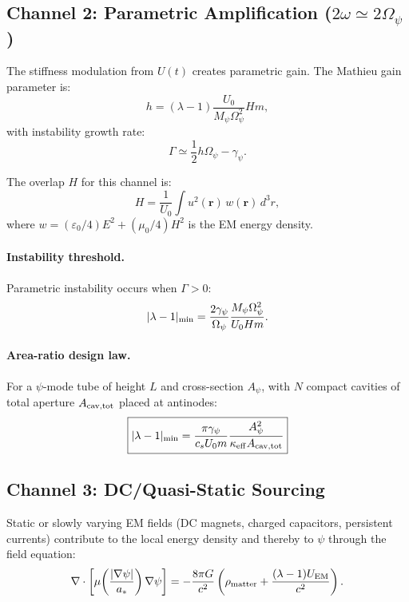 \documentclass[aps,prd,twocolumn,superscriptaddress,floatfix,nofootinbib]{revtex4-2}
\newcommand{\astar}{a_*}
\newcommand{\Opsi}{\Omega_\psi}
\newcommand{\gpsi}{\gamma_\psi}
\newcommand{\Mpsi}{M_\psi}
\newcommand{\lam}{\lambda}
\begin{document}
\subsection{Channel 2: Parametric Amplification ($2\omega \simeq 2\Opsi$)}

The stiffness modulation from $U(t)$ creates parametric gain. The Mathieu
gain parameter is:
\begin{equation}
h = (\lam - 1)\frac{U_0}{\Mpsi\Opsi^2}Hm,
\label{eq:mathieu-h}
\end{equation}
with instability growth rate:
\begin{equation}
\Gamma \simeq \frac{1}{2}h\Opsi - \gpsi.
\label{eq:growth-rate}
\end{equation}

The overlap $H$ for this channel is:
\begin{equation}
H = \frac{1}{U_0}\int u^2(\mathbf{r})\,w(\mathbf{r})\,d^3r,
\label{eq:H-overlap}
\end{equation}
where $w = (\varepsilon_0/4)E^2 + (\mu_0/4)H^2$ is the EM energy density.

\paragraph{Instability threshold.}
Parametric instability occurs when $\Gamma > 0$:
\begin{equation}
|\lam - 1|_{\rm min} = \frac{2\gpsi}{\Opsi}\frac{\Mpsi\Opsi^2}{U_0 H m}.
\label{eq:threshold}
\end{equation}

\paragraph{Area-ratio design law.}
For a $\psi$-mode tube of height $L$ and cross-section $A_\psi$, with
$N$ compact cavities of total aperture $A_{\rm cav,tot}$ placed at
antinodes:
\begin{equation}
\boxed{
|\lam - 1|_{\rm min} = \frac{\pi\gpsi}{c_s U_0 m}
\frac{A_\psi^2}{\kappa_{\rm eff}A_{\rm cav,tot}}
}
\label{eq:design-law}
\end{equation}

\subsection{Channel 3: DC/Quasi-Static Sourcing}

Static or slowly varying EM fields (DC magnets, charged capacitors,
persistent currents) contribute to the local energy density and thereby
to $\psi$ through the field equation:
\begin{equation}
\nabla\cdot\left[\mu\!\left(\frac{|\nabla\psi|}{\astar}\right)\nabla\psi\right]
= -\frac{8\pi G}{c^2}\left(\rho_{\rm matter} + \frac{(\lam-1)U_{\rm EM}}{c^2}\right).
\label{eq:dc-sourcing}
\end{equation}
\end{document}
